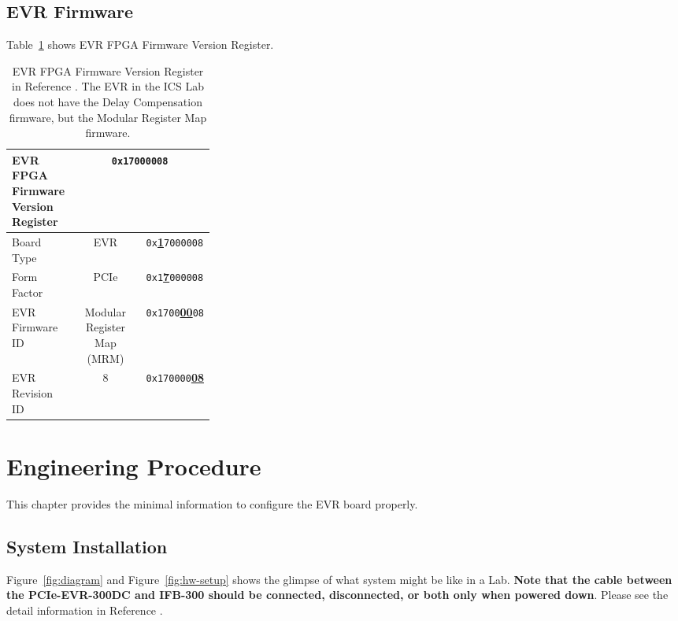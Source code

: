 \documentclass[11pt
  , a4paper
  , article
  , oneside
  , showtrims
]{memoir}
\begin{document}
\section{EVR Firmware}
Table~\ref{table:fwinfo} shows EVR FPGA Firmware Version Register.

\begin{table}[!htb]
  \centering
  \begin{tabular}{p{0.3\linewidth}|c|l}
    \toprule
    EVR FPGA Firmware Version Register            & \multicolumn{2}{c}{\texttt{0x17000008}}             \\\midrule
    Board Type      & EVR                         &  \texttt{0x}\underline{\textbf{1}}\texttt{7000008}  \\\midrule
    Form Factor     & PCIe                        &  \texttt{0x1}\underline{\textbf{7}}\texttt{000008}  \\\midrule
    EVR Firmware ID & Modular Register Map (MRM)  &  \texttt{0x1700}\underline{\textbf{00}}\texttt{08}  \\\midrule
    EVR Revision ID & 8                           &  \texttt{0x170000}\underline{\textbf{08}}           \\\bottomrule
  \end{tabular}
  \caption[]{EVR FPGA Firmware Version Register in Reference \citep[see][p66]{MRFEVENTSYSTEMDC}. The EVR in the ICS Lab does not have the Delay Compensation firmware, but the Modular Register Map firmware.}
  \label{table:fwinfo}
\end{table}


\clearpage
\chapter{Engineering Procedure}
This chapter provides the minimal information to configure the EVR board properly. 

\section{System Installation}
Figure~\ref{fig:diagram} and Figure~\ref{fig:hw-setup} shows the glimpse of what system might be like in a Lab. \textbf{Note that the cable between the PCIe-EVR-300DC and IFB-300 should be connected, disconnected, or both only when powered down}. Please see the detail information in Reference \citep[][p54]{MRFEVENTSYSTEMDC}.
  
\end{document}
